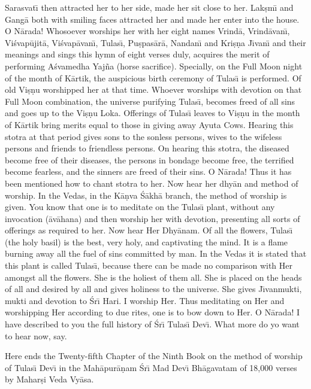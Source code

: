 Sarasvat\={\i} then attracted her to her side, made her sit close to her. Lak\d{s}m\={\i} and Gang\=a both with smiling faces attracted her and made her enter into the house. O N\=arada! Whosoever worships her with her eight names Vrind\=a, Vrind\=avan\={\i}, Vi\'svap\=ujit\=a, Vi\'svap\=avan\={\i}, Tulas\={\i}, Pu\d{s}pas\=ar\=a, Nandan\={\i} and Kri\d{s}\d{n}a J\={\i}van\={\i} and their meanings and sings this hymn of eight verses duly, acquires the merit of performing A\'svamedha Yaj\~na (horse sacrifice). Specially, on the Full Moon night of the month of K\=artik, the auspicious birth ceremony of Tulas\={\i} is performed. Of old Vi\d{s}\d{n}u worshipped her at that time. Whoever worships with devotion on that Full Moon combination, the universe purifying Tulas\={\i}, becomes freed of all sins and goes up to the Vi\d{s}\d{n}u Loka. Offerings of Tulas\={\i} leaves to Vi\d{s}\d{n}u in the month of K\=artik bring merits equal to those in giving away Ayuta Cows. Hearing this stotra at that period gives sons to the sonless persons, wives to the wifeless persons and friends to friendless persons. On hearing this stotra, the diseased become free of their diseases, the persons in bondage become free, the terrified become fearless, and the sinners are freed of their sins. O N\=arada! Thus it has been mentioned how to chant stotra to her. Now hear her dhy\=an and method of worship. In the Vedas, in the K\=a\d{n}va \'S\=akh\=a branch, the method of worship is given. You know that one is to meditate on the Tulas\={\i} plant, without any invocation (\=av\=ahana) and then worship her with devotion, presenting all sorts of offerings as required to her. Now hear Her Dhy\=anam. Of all the flowers, Tulas\={\i} (the holy basil) is the best, very holy, and captivating the mind. It is a flame burning away all the fuel of sins committed by man. In the Vedas it is stated that this plant is called Tulas\={\i}, because there can be made no comparison with Her amongst all the flowers. She is the holiest of them all. She is placed on the heads of all and desired by all and gives holiness to the universe. She gives J\={\i}vanmukti, mukti and devotion to \'Sr\={\i} Hari. I worship Her. Thus meditating on Her and worshipping Her according to due rites, one is to bow down to Her. O N\=arada! I have described to you the full history of \'Sr\={\i} Tulas\={\i} Dev\={\i}. What more do yo want to hear now, say.

Here ends the Twenty-fifth Chapter of the Ninth Book on the method of worship of Tulas\={\i} Dev\={\i} in the Mah\=apur\=a\d{n}am \'Sr\={\i} Mad Dev\={\i} Bh\=agavatam of 18,000 verses by Mahar\d{s}i Veda Vy\=asa.



